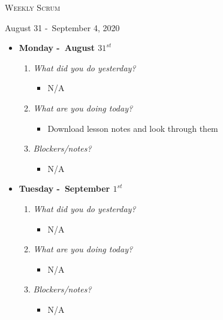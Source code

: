 \centerline{\LARGE\textsc{Weekly Scrum}}
\centerline{August 31 -\ September 4, 2020}
\textbf{}
\begin{itemize}
  \item[] \textbf{\large Monday -\ August \(31^{st}\)}
  \begin{enumerate}
    \item \textsl{What did you do yesterday?}
    \begin{itemize}
      \item N/A
    \end{itemize}
    \item \textsl{What are you doing today?}
    \begin{itemize}
      \item Download lesson notes and look through them
    \end{itemize}
    \item \textsl{Blockers/notes?}
    \begin{itemize}
      \item N/A
    \end{itemize}
  \end{enumerate} 
\end{itemize}
\textbf{}
\begin{itemize}
  \item[] \textbf{\large Tuesday -\ September \(1^{st}\)}
  \begin{enumerate}
    \item \textsl{What did you do yesterday?}
    \begin{itemize}
      \item N/A
    \end{itemize}
    \item \textsl{What are you doing today?}
    \begin{itemize}
      \item N/A
    \end{itemize}
    \item \textsl{Blockers/notes?}
    \begin{itemize}
      \item N/A
    \end{itemize}
  \end{enumerate}
\end{itemize}
\textbf{}
